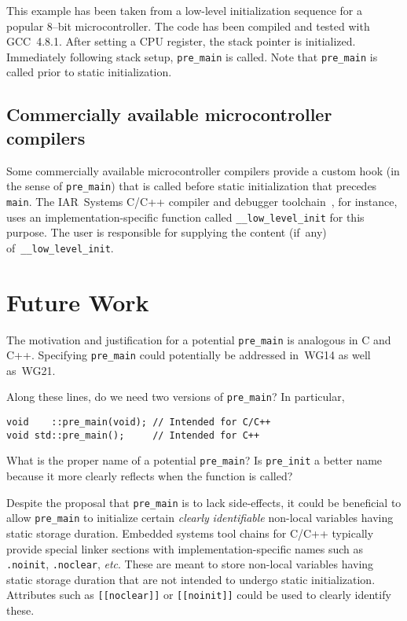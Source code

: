 \documentclass[11pt]{article}
\begin{document}
This example has been taken from a low-level
initialization sequence for a popular 8--bit microcontroller.
The code has been compiled and tested with GCC~4.8.1.
After setting a CPU register, the stack pointer is initialized.
Immediately following stack setup, \lstinline{pre_main} is called.
Note that \lstinline{pre_main} is called prior to
static initialization.

\subsection*{Commercially available microcontroller compilers}

Some commercially available microcontroller compilers provide
a custom hook (in the sense of \lstinline{pre_main}) that
is called before static initialization that precedes \lstinline{main}.
The IAR~Systems C/C++ compiler and debugger toolchain~\cite{bib:iar2015},
for instance, uses an implementation-specific function
called \lstinline{__low_level_init} for this purpose.
The user is responsible for supplying the content (if~any)
of~\lstinline{__low_level_init}.

\section{Future Work}

The motivation and justification for a potential \lstinline{pre_main}
is analogous in C and C++. Specifying \lstinline{pre_main}
could potentially be addressed in~WG14 as well as~WG21.

Along these lines, do we need two versions of \lstinline{pre_main}?
In particular,

\begin{lstlisting}
void    ::pre_main(void); // Intended for C/C++
void std::pre_main();     // Intended for C++
\end{lstlisting}

What is the proper name of a potential \lstinline{pre_main}?
Is \lstinline{pre_init} a better name because it
more clearly reflects when the function is called?

Despite the proposal that \lstinline{pre_main} is to lack side-effects,
it could be beneficial to allow \lstinline{pre_main} to initialize certain
\emph{clearly} \emph{identifiable} non-local variables
having static storage duration.
Embedded systems tool chains for C/C++ typically provide special
linker sections with implementation-specific names such as
\lstinline{.noinit}, \lstinline{.noclear}, \emph{etc}. These are meant
to store non-local variables having static storage duration that are not
intended to undergo static initialization.
Attributes such as \lstinline{[[noclear]]} or \lstinline{[[noinit]]}
could be used to clearly identify these.
\end{document}
